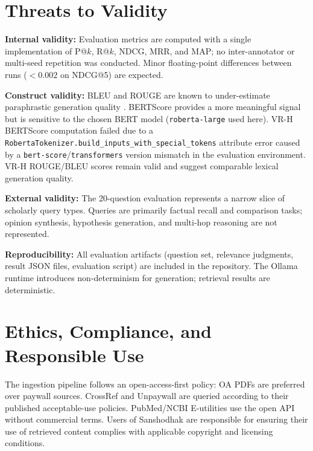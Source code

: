 \documentclass[conference,10pt,twocolumn]{IEEEtran}
\begin{document}
\section{Threats to Validity}

\textbf{Internal validity:} Evaluation metrics are computed with a single implementation of P@$k$, R@$k$, NDCG, MRR, and MAP; no inter-annotator or multi-seed repetition was conducted. Minor floating-point differences between runs ($<0.002$ on NDCG@5) are expected.

\textbf{Construct validity:} BLEU and ROUGE are known to under-estimate paraphrastic generation quality \cite{zhang2020bertscore}. BERTScore provides a more meaningful signal but is sensitive to the chosen BERT model (\texttt{roberta-large} used here). VR-H BERTScore computation failed due to a \texttt{RobertaTokenizer.build\_inputs\_with\_special\_tokens} attribute error caused by a \texttt{bert-score}/\texttt{transformers} version mismatch in the evaluation environment. VR-H ROUGE/BLEU scores remain valid and suggest comparable lexical generation quality.

\textbf{External validity:} The 20-question evaluation represents a narrow slice of scholarly query types. Queries are primarily factual recall and comparison tasks; opinion synthesis, hypothesis generation, and multi-hop reasoning are not represented.

\textbf{Reproducibility:} All evaluation artifacts (question set, relevance judgments, result JSON files, evaluation script) are included in the repository. The Ollama runtime introduces non-determinism for generation; retrieval results are deterministic.

\section{Ethics, Compliance, and Responsible Use}

The ingestion pipeline follows an open-access-first policy: OA PDFs are preferred over paywall sources. CrossRef and Unpaywall are queried according to their published acceptable-use policies. PubMed/NCBI E-utilities use the open API without commercial terms. Users of Sanshodhak are responsible for ensuring their use of retrieved content complies with applicable copyright and licensing conditions.
\end{document}
